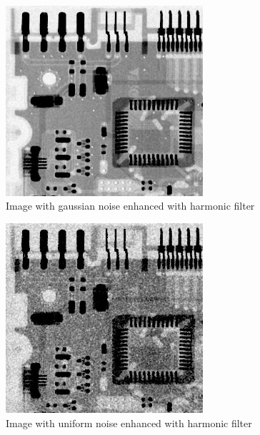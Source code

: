 \documentclass[10pt]{article}
\begin{document}
\begin{figure}[!ht]
	\centering
	\includegraphics[height=200pt]{./ex4/gaussharmo.jpg}
	\caption{Image with gaussian noise enhanced with harmonic filter}
\end{figure}
\begin{figure}[!ht]
	\centering
	\includegraphics[height=200pt]{./ex4/uniharmo.jpg}
	\caption{Image with uniform noise enhanced with harmonic filter}
\end{figure}
\end{document}
